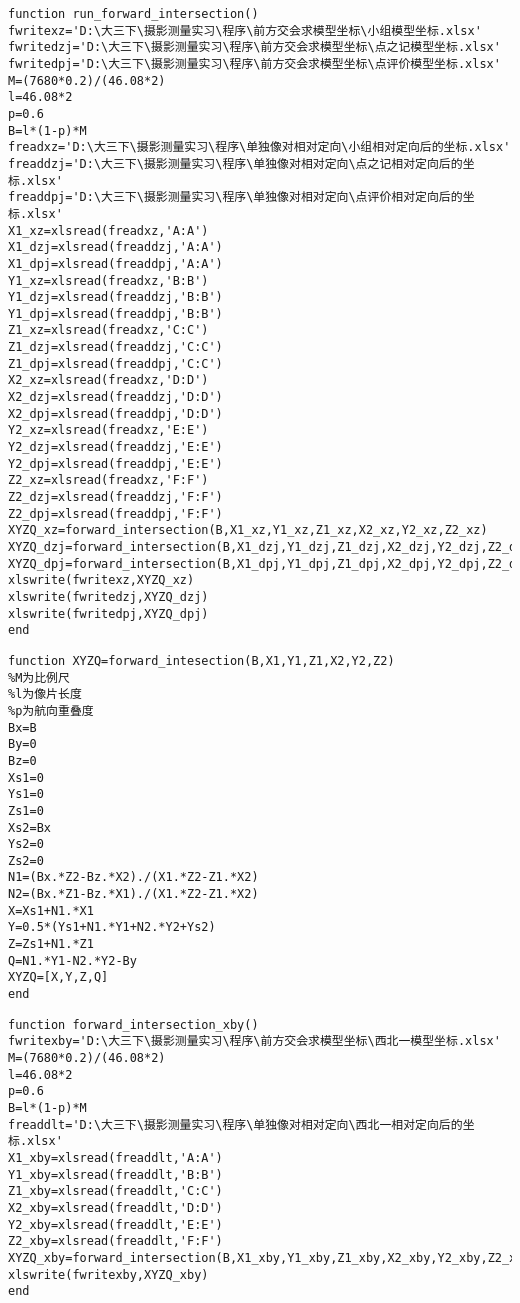 \begin{lstlisting}[caption=run\_forward\_intersection.m]
function run_forward_intersection()
fwritexz='D:\大三下\摄影测量实习\程序\前方交会求模型坐标\小组模型坐标.xlsx'
fwritedzj='D:\大三下\摄影测量实习\程序\前方交会求模型坐标\点之记模型坐标.xlsx'
fwritedpj='D:\大三下\摄影测量实习\程序\前方交会求模型坐标\点评价模型坐标.xlsx'
M=(7680*0.2)/(46.08*2)
l=46.08*2
p=0.6
B=l*(1-p)*M
freadxz='D:\大三下\摄影测量实习\程序\单独像对相对定向\小组相对定向后的坐标.xlsx'
freaddzj='D:\大三下\摄影测量实习\程序\单独像对相对定向\点之记相对定向后的坐标.xlsx'
freaddpj='D:\大三下\摄影测量实习\程序\单独像对相对定向\点评价相对定向后的坐标.xlsx'
X1_xz=xlsread(freadxz,'A:A')
X1_dzj=xlsread(freaddzj,'A:A')
X1_dpj=xlsread(freaddpj,'A:A')
Y1_xz=xlsread(freadxz,'B:B')
Y1_dzj=xlsread(freaddzj,'B:B')
Y1_dpj=xlsread(freaddpj,'B:B')
Z1_xz=xlsread(freadxz,'C:C')
Z1_dzj=xlsread(freaddzj,'C:C')
Z1_dpj=xlsread(freaddpj,'C:C')
X2_xz=xlsread(freadxz,'D:D')
X2_dzj=xlsread(freaddzj,'D:D')
X2_dpj=xlsread(freaddpj,'D:D')
Y2_xz=xlsread(freadxz,'E:E')
Y2_dzj=xlsread(freaddzj,'E:E')
Y2_dpj=xlsread(freaddpj,'E:E')
Z2_xz=xlsread(freadxz,'F:F')
Z2_dzj=xlsread(freaddzj,'F:F')
Z2_dpj=xlsread(freaddpj,'F:F')
XYZQ_xz=forward_intersection(B,X1_xz,Y1_xz,Z1_xz,X2_xz,Y2_xz,Z2_xz)
XYZQ_dzj=forward_intersection(B,X1_dzj,Y1_dzj,Z1_dzj,X2_dzj,Y2_dzj,Z2_dzj)
XYZQ_dpj=forward_intersection(B,X1_dpj,Y1_dpj,Z1_dpj,X2_dpj,Y2_dpj,Z2_dpj)
xlswrite(fwritexz,XYZQ_xz)
xlswrite(fwritedzj,XYZQ_dzj)
xlswrite(fwritedpj,XYZQ_dpj)
end 
\end{lstlisting}

\begin{lstlisting}[caption=forward\_intersection.m]
function XYZQ=forward_intesection(B,X1,Y1,Z1,X2,Y2,Z2)
%M为比例尺
%l为像片长度
%p为航向重叠度
Bx=B
By=0
Bz=0
Xs1=0
Ys1=0
Zs1=0
Xs2=Bx
Ys2=0
Zs2=0
N1=(Bx.*Z2-Bz.*X2)./(X1.*Z2-Z1.*X2)
N2=(Bx.*Z1-Bz.*X1)./(X1.*Z2-Z1.*X2)
X=Xs1+N1.*X1
Y=0.5*(Ys1+N1.*Y1+N2.*Y2+Ys2)
Z=Zs1+N1.*Z1
Q=N1.*Y1-N2.*Y2-By
XYZQ=[X,Y,Z,Q]
end
\end{lstlisting}

\begin{lstlisting}[caption=forward\_intersection\_xby.m]
function forward_intersection_xby()
fwritexby='D:\大三下\摄影测量实习\程序\前方交会求模型坐标\西北一模型坐标.xlsx'
M=(7680*0.2)/(46.08*2)
l=46.08*2
p=0.6
B=l*(1-p)*M
freaddlt='D:\大三下\摄影测量实习\程序\单独像对相对定向\西北一相对定向后的坐标.xlsx'
X1_xby=xlsread(freaddlt,'A:A')
Y1_xby=xlsread(freaddlt,'B:B')
Z1_xby=xlsread(freaddlt,'C:C')
X2_xby=xlsread(freaddlt,'D:D')
Y2_xby=xlsread(freaddlt,'E:E')
Z2_xby=xlsread(freaddlt,'F:F')
XYZQ_xby=forward_intersection(B,X1_xby,Y1_xby,Z1_xby,X2_xby,Y2_xby,Z2_xby)
xlswrite(fwritexby,XYZQ_xby)
end
\end{lstlisting}

